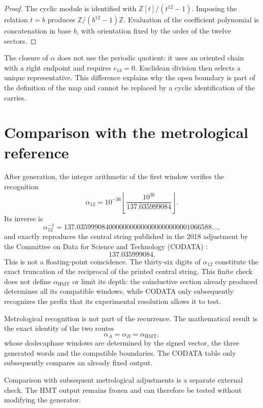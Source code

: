 \begin{proof}
The cyclic module is identified with
\(\mathbb Z[t]/(t^{12}-1)\). Imposing the relation \(t=b\) produces
\(\mathbb Z/(b^{12}-1)\mathbb Z\). Evaluation of the coefficient
polynomial is concatenation in base \(b\), with orientation fixed
by the order of the twelve sectors.
\end{proof}

The closure of \(\alpha\) does not use the periodic quotient: it uses an oriented
chain with a right endpoint and requires \(c_{13}=0\). Euclidean division
then selects a unique representative. This difference explains
why the open boundary is part of the definition of the map and
cannot be replaced by a cyclic identification of the carries.

\section{Comparison with the metrological reference}

After generation, the integer arithmetic of the first window
verifies the recognition
\[
\boxed{
\alpha_{12}
=10^{-36}
\left\lfloor\frac{10^{36}}{137.035999084}\right\rfloor.}
\]
Its inverse is
\[
\alpha_{12}^{-1}
=137.03599908400000000000000000000001066588\ldots,
\]
and exactly reproduces the central string published in the 2018 adjustment by the
Committee on Data for Science and Technology (CODATA) \cite{Tiesinga2021CODATA}:
\[
\boxed{137.035999084.}
\]
This is not a floating-point coincidence. The thirty-six digits of
\(\alpha_{12}\) constitute the exact truncation of the reciprocal of the
printed central string. This finite check does not define
\(\alpha_{\mathrm{HMT}}\) or limit its depth: the coinductive section
already produced determines all its compatible windows, while CODATA only
subsequently recognizes the prefix that its experimental resolution allows
it to test.

Metrological recognition is not part of the recurrence. The mathematical
result is the exact identity of the two routes
\[
 \alpha_A=\alpha_B=\alpha_{\mathrm{HMT}},
\]
whose dodecaphase windows are determined by the signed vector, the
three generated words and the compatible boundaries. The CODATA table
only subsequently compares an already fixed output.

Comparison with subsequent metrological adjustments is a separate external
check. The HMT output remains frozen and can therefore be tested without
modifying the generator.

